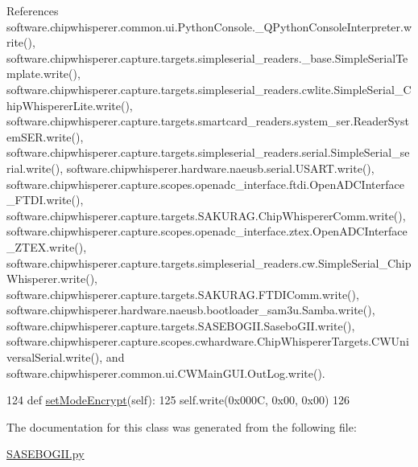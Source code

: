 References software.\+chipwhisperer.\+common.\+ui.\+Python\+Console.\+\_\+\+Q\+Python\+Console\+Interpreter.\+write(), software.\+chipwhisperer.\+capture.\+targets.\+simpleserial\+\_\+readers.\+\_\+base.\+Simple\+Serial\+Template.\+write(), software.\+chipwhisperer.\+capture.\+targets.\+simpleserial\+\_\+readers.\+cwlite.\+Simple\+Serial\+\_\+\+Chip\+Whisperer\+Lite.\+write(), software.\+chipwhisperer.\+capture.\+targets.\+smartcard\+\_\+readers.\+system\+\_\+ser.\+Reader\+System\+S\+E\+R.\+write(), software.\+chipwhisperer.\+capture.\+targets.\+simpleserial\+\_\+readers.\+serial.\+Simple\+Serial\+\_\+serial.\+write(), software.\+chipwhisperer.\+hardware.\+naeusb.\+serial.\+U\+S\+A\+R\+T.\+write(), software.\+chipwhisperer.\+capture.\+scopes.\+openadc\+\_\+interface.\+ftdi.\+Open\+A\+D\+C\+Interface\+\_\+\+F\+T\+D\+I.\+write(), software.\+chipwhisperer.\+capture.\+targets.\+S\+A\+K\+U\+R\+A\+G.\+Chip\+Whisperer\+Comm.\+write(), software.\+chipwhisperer.\+capture.\+scopes.\+openadc\+\_\+interface.\+ztex.\+Open\+A\+D\+C\+Interface\+\_\+\+Z\+T\+E\+X.\+write(), software.\+chipwhisperer.\+capture.\+targets.\+simpleserial\+\_\+readers.\+cw.\+Simple\+Serial\+\_\+\+Chip\+Whisperer.\+write(), software.\+chipwhisperer.\+capture.\+targets.\+S\+A\+K\+U\+R\+A\+G.\+F\+T\+D\+I\+Comm.\+write(), software.\+chipwhisperer.\+hardware.\+naeusb.\+bootloader\+\_\+sam3u.\+Samba.\+write(), software.\+chipwhisperer.\+capture.\+targets.\+S\+A\+S\+E\+B\+O\+G\+I\+I.\+Sasebo\+G\+I\+I.\+write(), software.\+chipwhisperer.\+capture.\+scopes.\+cwhardware.\+Chip\+Whisperer\+Targets.\+C\+W\+Universal\+Serial.\+write(), and software.\+chipwhisperer.\+common.\+ui.\+C\+W\+Main\+G\+U\+I.\+Out\+Log.\+write().


\begin{DoxyCode}
124     \textcolor{keyword}{def }\hyperlink{classsoftware_1_1chipwhisperer_1_1capture_1_1targets_1_1SASEBOGII_1_1SaseboGIIAESRev1_aae380362b2c01036d8b7aa8a0410d02e}{setModeEncrypt}(self):
125         self.write(0x000C, 0x00, 0x00)
126 
\end{DoxyCode}


The documentation for this class was generated from the following file\+:\begin{DoxyCompactItemize}
\item 
\hyperlink{SASEBOGII_8py}{S\+A\+S\+E\+B\+O\+G\+I\+I.\+py}\end{DoxyCompactItemize}
